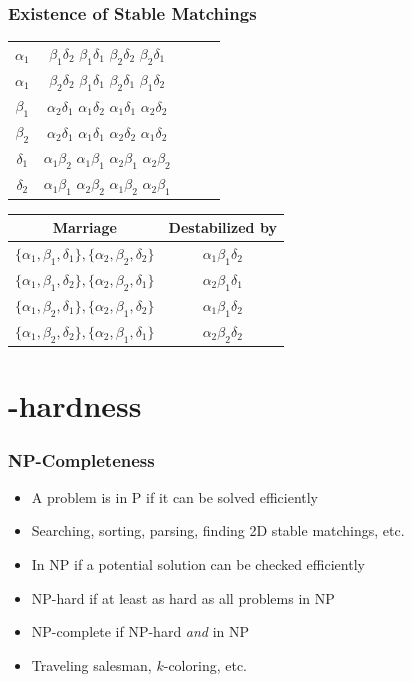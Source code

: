 \documentclass[mathserif,serif]{beamer}
\begin{document}
\begin{frame}
  \frametitle{Existence of Stable Matchings}

    \begin{center}
      \begin{tabular}{c | c c c c}
        $\alpha_1$ & $\beta_1\delta_2$ $\beta_1\delta_1$ $\beta_2\delta_2$ $\beta_2\delta_1$ \\
        $\alpha_1$ & $\beta_2\delta_2$ $\beta_1\delta_1$ $\beta_2\delta_1$ $\beta_1\delta_2$ \\ \hline
        $\beta_1$ & $\alpha_2\delta_1$ $\alpha_1\delta_2$ $\alpha_1\delta_1$ $\alpha_2\delta_2$ \\
        $\beta_2$ & $\alpha_2\delta_1$ $\alpha_1\delta_1$ $\alpha_2\delta_2$ $\alpha_1\delta_2$ \\ \hline
        $\delta_1$ & $\alpha_1\beta_2$ $\alpha_1\beta_1$ $\alpha_2\beta_1$ $\alpha_2\beta_2$ \\
        $\delta_2$ & $\alpha_1\beta_1$ $\alpha_2\beta_2$ $\alpha_1\beta_2$ $\alpha_2\beta_1$ \\
      \end{tabular}
      \begin{tabular}{c | c}
        Marriage & Destabilized by \\ \hline
        $\{\alpha_1, \beta_1, \delta_1\}, \{\alpha_2, \beta_2, \delta_2\}$ & $\alpha_1\beta_1\delta_2$ \\
        $\{\alpha_1, \beta_1, \delta_2\}, \{\alpha_2, \beta_2, \delta_1\}$ & $\alpha_2\beta_1\delta_1$ \\
        $\{\alpha_1, \beta_2, \delta_1\}, \{\alpha_2, \beta_1, \delta_2\}$ & $\alpha_1\beta_1\delta_2$ \\
        $\{\alpha_1, \beta_2, \delta_2\}, \{\alpha_2, \beta_1, \delta_1\}$ & $\alpha_2\beta_2\delta_2$ \\
      \end{tabular}
    \end{center}
\end{frame}

\section{\NP-hardness}

\begin{frame}
  \frametitle{NP-Completeness}
  \begin{itemize}
  \item A problem is in P if it can be solved efficiently
  \item Searching, sorting, parsing, finding 2D stable matchings, etc.
  \item In NP if a potential solution can be checked efficiently
  \item NP-hard if at least as hard as all problems in NP
  \item NP-complete if NP-hard \emph{and} in NP
  \item Traveling salesman, $k$-coloring, etc.
  \end{itemize}
\end{frame}
\end{document}
